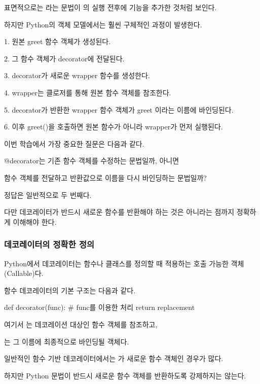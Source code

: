 표면적으로는 라는 문법이 의 실행 전후에 기능을 추가한 것처럼 보인다.

하지만 Python의 객체 모델에서는 훨씬 구체적인 과정이 발생한다.

\begin{dhksmry}
    1. 원본 greet 함수 객체가 생성된다.

    2. 그 함수 객체가 decorator에 전달된다.

    3. decorator가 새로운 wrapper 함수를 생성한다.

    4. wrapper는 클로저를 통해 원본 함수 객체를 참조한다.

    5. decorator가 반환한 wrapper 함수 객체가 
       greet 이라는 이름에 바인딩된다.

    6. 이후 greet()을 호출하면 원본 함수가 아니라 
       wrapper가 먼저 실행된다.
\end{dhksmry}

이번 학습에서 가장 중요한 질문은 다음과 같다.

\begin{dhksmry}[centered]
@decorator는 기존 함수 객체를 수정하는 문법일까, 아니면

함수 객체를 전달하고 반환값으로 이름을 다시 바인딩하는 문법일까?
\end{dhksmry}

정답은 일반적으로 두 번째다.

다만 데코레이터가 반드시 새로운 함수를 반환해야 하는 것은 아니라는 점까지 정확하게 이해해야 한다.

\subsubsection{데코레이터의 정확한 정의}

Python에서 데코레이터는 함수나 클래스를 정의할 때 적용하는 호출 가능한 객체(Callable)다.

함수 데코레이터의 기본 구조는 다음과 같다.

\begin{dhkcode}
def decorator(func):
    # func를 이용한 처리
    return replacement
\end{dhkcode}

여기서 는 데코레이션 대상인 함수 객체를 참조하고,

는 그 이름에 최종적으로 바인딩될 객체다.

일반적인 함수 기반 데코레이터에서는 가 새로운 함수 객체인 경우가 많다.

하지만 Python 문법이 반드시 새로운 함수 객체를 반환하도록 강제하지는 않는다.

